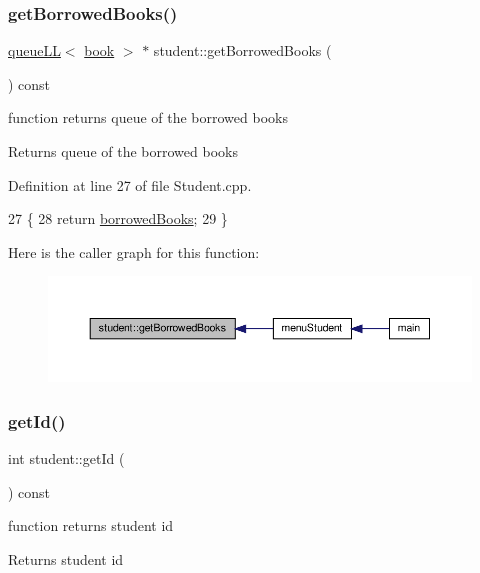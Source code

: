 \subsubsection{\texorpdfstring{get\+Borrowed\+Books()}{getBorrowedBooks()}}
{\footnotesize\ttfamily \hyperlink{classqueue_l_l}{queue\+LL}$<$ \hyperlink{classbook}{book} $>$ $\ast$ student\+::get\+Borrowed\+Books (\begin{DoxyParamCaption}{ }\end{DoxyParamCaption}) const}

function returns queue of the borrowed books \begin{DoxyReturn}{Returns}
queue of the borrowed books 
\end{DoxyReturn}


Definition at line 27 of file Student.\+cpp.


\begin{DoxyCode}
27                                                \{
28     \textcolor{keywordflow}{return} \hyperlink{classstudent_ab477f6c1525709586ea41364dc8c568b}{borrowedBooks};
29 \}
\end{DoxyCode}
Here is the caller graph for this function\+:
\nopagebreak
\begin{figure}[H]
\begin{center}
\leavevmode
\includegraphics[width=350pt]{classstudent_a27120d590ee93cc80c5b9d72d91a2eb3_icgraph}
\end{center}
\end{figure}
\mbox{\label{classstudent_a718b1fdd02dd1ed06110f9e0e7ec7720}} 
\subsubsection{\texorpdfstring{get\+Id()}{getId()}}
{\footnotesize\ttfamily int student\+::get\+Id (\begin{DoxyParamCaption}{ }\end{DoxyParamCaption}) const}

function returns student id \begin{DoxyReturn}{Returns}
student id 
\end{DoxyReturn}


